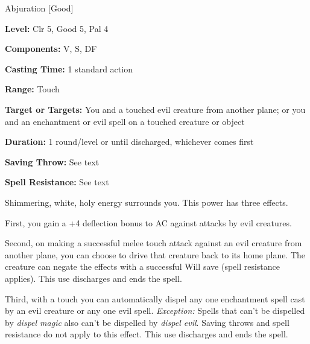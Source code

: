 
Abjuration [Good]

\textbf{Level:} Clr 5, Good 5, Pal 4

\textbf{Components:} V, S, DF

\textbf{Casting Time:} 1 standard action

\textbf{Range:} Touch

\textbf{Target or Targets:} You and a touched evil creature from another plane; 
or you and an enchantment or evil spell on a touched creature or object

\textbf{Duration:} 1 round/level or until discharged, whichever comes first

\textbf{Saving Throw:} See text

\textbf{Spell Resistance:} See text

Shimmering, white, holy energy surrounds you. This power has three effects.

First, you gain a +4 deflection bonus to AC against attacks by evil creatures.

Second, on making a successful melee touch attack against an evil creature from 
another plane, you can choose to drive that creature back to its home plane. The 
creature can negate the effects with a successful Will save (spell resistance applies). 
This use discharges and ends the spell.

Third, with a touch you can automatically dispel any one enchantment spell cast 
by an evil creature or any one evil spell. \textit{Exception:} Spells that can't 
be dispelled by \textit{dispel magic} also can't be dispelled by \textit{dispel 
evil}. Saving throws and spell resistance do not apply to this effect. This use 
discharges and ends the spell.

